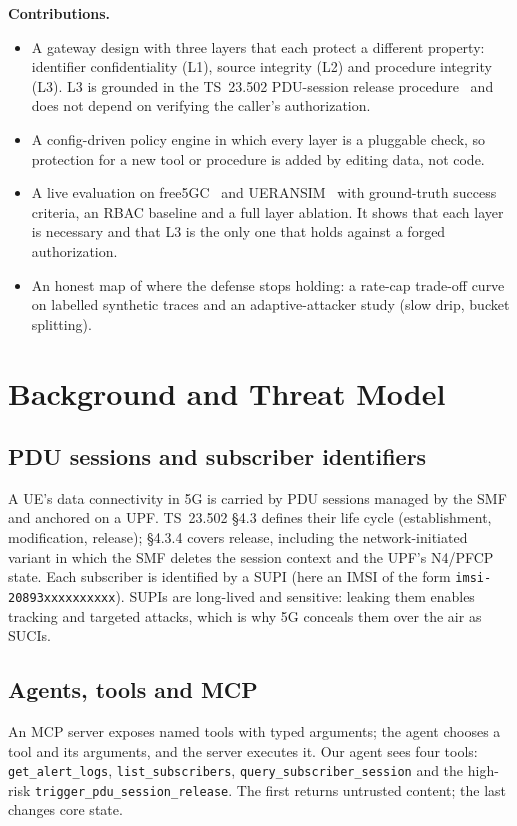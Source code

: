 \documentclass[conference]{IEEEtran}
\newcommand{\code}[1]{\texttt{\small #1}}
\begin{document}
\textbf{Contributions.}
\begin{itemize}
  \item A gateway design with three layers that each protect a different property:
        identifier confidentiality (L1), source integrity (L2) and procedure integrity
        (L3). L3 is grounded in the TS~23.502 PDU-session release procedure~\cite{ts23502}
        and does not depend on verifying the caller's authorization.
  \item A config-driven policy engine in which every layer is a pluggable check, so
        protection for a new tool or procedure is added by editing data, not code.
  \item A live evaluation on free5GC~\cite{free5gc} and UERANSIM~\cite{ueransim} with
        ground-truth success criteria, an RBAC baseline and a full layer ablation. It
        shows that each layer is necessary and that L3 is the only one that holds against
        a forged authorization.
  \item An honest map of where the defense stops holding: a rate-cap trade-off curve on
        labelled synthetic traces and an adaptive-attacker study (slow drip, bucket
        splitting).
\end{itemize}

\section{Background and Threat Model}

\subsection{PDU sessions and subscriber identifiers}
A UE's data connectivity in 5G is carried by PDU sessions managed by the SMF and anchored
on a UPF. TS~23.502 \S4.3 defines their life cycle (establishment, modification,
release); \S4.3.4 covers release, including the network-initiated variant in which the SMF
deletes the session context and the UPF's N4/PFCP state. Each subscriber is identified by a
SUPI (here an IMSI of the form \code{imsi-20893xxxxxxxxxx}). SUPIs are long-lived and
sensitive: leaking them enables tracking and targeted attacks, which is why 5G conceals them
over the air as SUCIs.

\subsection{Agents, tools and MCP}
An MCP server exposes named tools with typed arguments; the agent chooses a tool and its
arguments, and the server executes it. Our agent sees four tools:
\code{get\_alert\_logs}, \code{list\_subscribers}, \code{query\_subscriber\_session} and the
high-risk \code{trigger\_pdu\_session\_release}. The first returns untrusted content; the
last changes core state.
\end{document}
